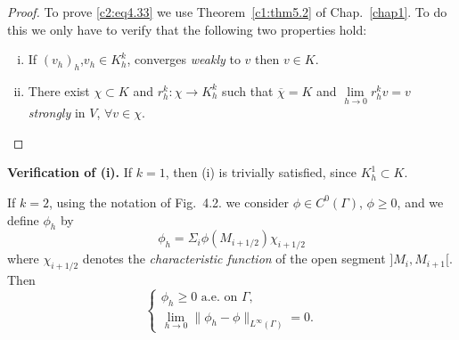 \begin{proof}
To prove \eqref{c2:eq4.33} we use Theorem~\ref{c1:thm5.2} of
Chap.~\ref{chap1}. To do this we only have 
to verify that the following two properties hold:  
\begin{enumerate}[(i)]
\item If $(v_h)_h$,\pageoriginale  $v_h \in K^k_h$, converges \textit{weakly} to
  $v$ then  $v \in K$.  
\item There exist $\chi \subset K$ and $r^k_h : \chi \to K^k_h $ such
  that $\overline{\chi}= K$ and $\displaystyle{\lim\limits_{h \to 0}} r^k_h v = v$ \textit{
    strongly } in $V$, $\forall v \in \chi$. 
\end{enumerate}
\end{proof}

\medskip 
\noindent 
\textbf{Verification of (i). }%
 If $k=1$, then (i) is trivially  satisfied, since $K^1_h \subset K$. 

\begin{figure}[H]
  \caption{}
\end{figure}

If $k=2$, using the notation of Fig.~4.2. we consider $\phi \in
C^0 (\Gamma)$, $\phi \geq 0$, and we define $\phi_h$ by  
\begin{equation}
\phi_h = \Sigma_i \phi (M_{i+1/2}) \chi_{i+1/2}
\tag{4.34}\label{c2:eq4.34} 
\end{equation}
where $\chi_{i+1/2}$ denotes the \textit{characteristic function} of
the open segment $] M_i, M_{i+1}[$. Then  
\begin{equation}
\begin{cases}
\phi_h \geq 0 \text{ a.e. on } \Gamma ,\\
\lim\limits_{h \to 0} \parallel \phi_h - \phi\parallel_{L^\infty (\Gamma)} =
0. \tag{4.35}\label{c2:eq4.35}  
\end{cases}
\end{equation}

